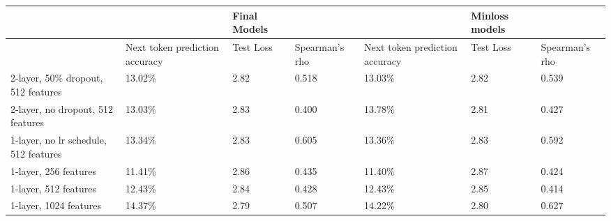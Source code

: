 \begin{table}[]
\begin{tabular}{|l|lll|lll|}
\hline
                                      &                                                     & Final Models                   &                &                                                     & Minloss models                 &                \\ \hline
                                      & \multicolumn{1}{l|}{Next token prediction accuracy} & \multicolumn{1}{l|}{Test Loss} & Spearman's rho & \multicolumn{1}{l|}{Next token prediction accuracy} & \multicolumn{1}{l|}{Test Loss} & Spearman's rho \\ \hline
2-layer, 50\% dropout, 512 features   & \multicolumn{1}{l|}{13.02\%}                        & \multicolumn{1}{l|}{2.82}      & 0.518          & \multicolumn{1}{l|}{13.03\%}                        & \multicolumn{1}{l|}{2.82}      & 0.539          \\ \hline
2-layer, no dropout, 512 features     & \multicolumn{1}{l|}{13.03\%}                        & \multicolumn{1}{l|}{2.83}      & 0.400          & \multicolumn{1}{l|}{13.78\%}                        & \multicolumn{1}{l|}{2.81}      & 0.427          \\ \hline
1-layer, no lr schedule, 512 features & \multicolumn{1}{l|}{13.34\%}                        & \multicolumn{1}{l|}{2.83}      & 0.605          & \multicolumn{1}{l|}{13.36\%}                        & \multicolumn{1}{l|}{2.83}      & 0.592          \\ \hline
1-layer, 256 features                 & \multicolumn{1}{l|}{11.41\%}                        & \multicolumn{1}{l|}{2.86}      & 0.435          & \multicolumn{1}{l|}{11.40\%}                        & \multicolumn{1}{l|}{2.87}      & 0.424          \\ \hline
1-layer, 512 features                 & \multicolumn{1}{l|}{12.43\%}                        & \multicolumn{1}{l|}{2.84}      & 0.428          & \multicolumn{1}{l|}{12.43\%}                        & \multicolumn{1}{l|}{2.85}      & 0.414          \\ \hline
1-layer, 1024 features                & \multicolumn{1}{l|}{14.37\%}                        & \multicolumn{1}{l|}{2.79}      & 0.507          & \multicolumn{1}{l|}{14.22\%}                        & \multicolumn{1}{l|}{2.80}      & 0.627          \\ \hline
\end{tabular}
\end{table}